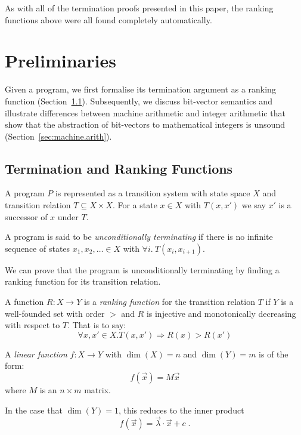 \documentclass[a4paper]{llncs}
\begin{document}
%
As with all of the termination proofs presented in this paper, the ranking
functions above were all found completely automatically.

\section{Preliminaries}

Given a program, we first formalise its termination argument as a ranking
function (Section~\ref{sec:ranking.functions}).  Subsequently, we discuss
bit-vector semantics and illustrate differences between machine arithmetic
and integer arithmetic that show that the abstraction of bit-vectors to
mathematical integers is unsound (Section~\ref{sec:machine.arith}).

\subsection{Termination and Ranking Functions} \label{sec:ranking.functions}

A program $P$ is represented as a transition system with state space $X$ and
transition relation $T \subseteq X \times X$.  For a state
$x \in X$ with $T(x,x')$ we say $x'$ is a successor of $x$ under $T$.

\begin{definition}
%
A program is said to be \emph{unconditionally terminating} if
there is no infinite sequence of states $x_1, x_2, \ldots \in X$ with
$\forall i.~T(x_i, x_{i+1})$.
%
\end{definition}

We can prove that the program is unconditionally terminating by
finding a ranking function for its transition relation.
%
\begin{definition}
%
A function ${R:X\to Y}$ is a \emph{ranking function} for the
transition relation $T$ if $Y$ is a well-founded set with order $>$ and 
$R$ is injective and monotonically decreasing with respect to $T$.  That is
to say:
$$\forall x, x' \in X. T(x, x') \Rightarrow R(x) > R(x')$$
%
\end{definition}

\begin{definition}
A \emph{linear function} $f: X \to Y$ 
with $\dim(X) = n$ and $\dim(Y) = m$ is of the form: $$f(\vec{x}) = M\vec{x}$$ where
$M$ is an $n \times m$ matrix.
\end{definition}

In the case that $\dim(Y) = 1$, this reduces to the inner product
%
$$f(\vec{x}) = \vec{\lambda} \cdotp \vec{x} + c \;.$$
\end{document}
